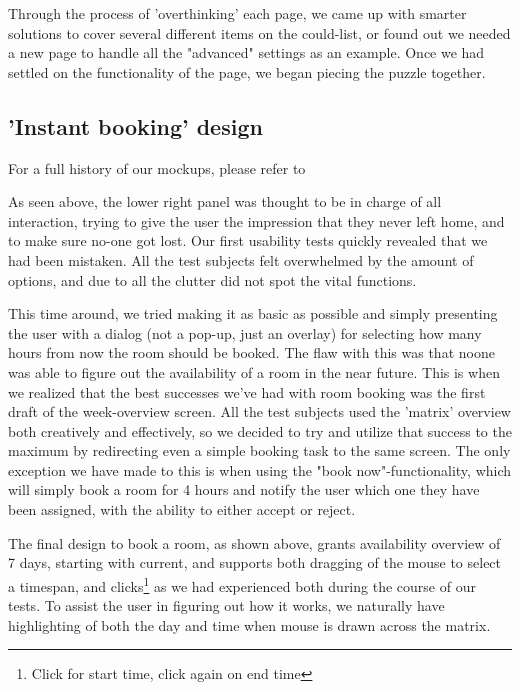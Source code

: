 Through the process of 'overthinking' each page, we came up with smarter solutions to cover several different items on the could-list, or found out we needed a new page to handle all the "advanced" settings as an example. Once we had settled on the functionality of the page, we began piecing the puzzle together.



\subsection{'Instant booking' design}
For a full history of our mockups, please refer to %


As seen above, the lower right panel was thought to be in charge of all interaction, trying to give the user the impression that they never left home, and to make sure no-one got lost. Our first usability tests quickly revealed that we had been mistaken. All the test subjects felt overwhelmed by the amount of options, and due to all the clutter did not spot the vital functions.


This time around, we tried making it as basic as possible and simply presenting the user with a dialog (not a pop-up, just an overlay) for selecting how many hours from now the room should be booked. The flaw with this was that noone was able to figure out the availability of a room in the near future. This is when we realized that the best successes we've had with room booking was the first draft of the week-overview screen.
All the test subjects used the 'matrix' overview both creatively and effectively, so we decided to try and utilize that success to the maximum by redirecting even a simple booking task to the same screen.
The only exception we have made to this is when using the "book now"-functionality, which will simply book a room for 4 hours and notify the user which one they have been assigned, with the ability to either accept or reject.


The final design to book a room, as shown above, grants availability overview of 7 days, starting with current, and supports both dragging of the mouse to select a timespan, and clicks\footnote{Click for start time, click again on end time} as we had experienced both during the course of our tests.
To assist the user in figuring out how it works, we naturally have highlighting of both the day and time when mouse is drawn across the matrix.

